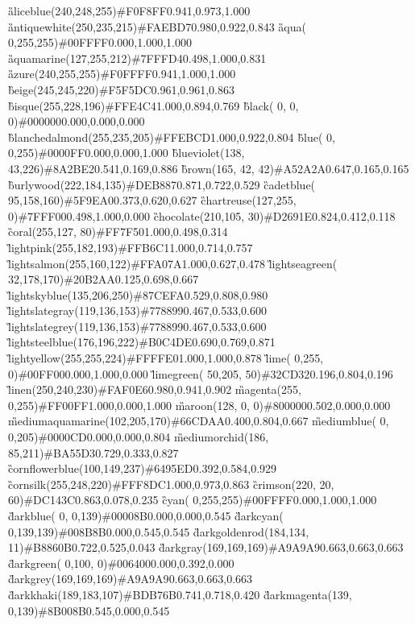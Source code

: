 \G{aliceblue}{(240,248,255)}{\#F0F8FF}{0.941,0.973,1.000}
\G{antiquewhite}{(250,235,215)}{\#FAEBD7}{0.980,0.922,0.843}
\G{aqua}{(  0,255,255)}{\#00FFFF}{0.000,1.000,1.000}
\G{aquamarine}{(127,255,212)}{\#7FFFD4}{0.498,1.000,0.831}
\G{azure}{(240,255,255)}{\#F0FFFF}{0.941,1.000,1.000}
\G{beige}{(245,245,220)}{\#F5F5DC}{0.961,0.961,0.863}
\G{bisque}{(255,228,196)}{\#FFE4C4}{1.000,0.894,0.769}
\G{black}{(  0,  0,  0)}{\#000000}{0.000,0.000,0.000}
\G{blanchedalmond}{(255,235,205)}{\#FFEBCD}{1.000,0.922,0.804}
\G{blue}{(  0,  0,255)}{\#0000FF}{0.000,0.000,1.000}
\G{blueviolet}{(138, 43,226)}{\#8A2BE2}{0.541,0.169,0.886}
\G{brown}{(165, 42, 42)}{\#A52A2A}{0.647,0.165,0.165}
\G{burlywood}{(222,184,135)}{\#DEB887}{0.871,0.722,0.529}
\G{cadetblue}{( 95,158,160)}{\#5F9EA0}{0.373,0.620,0.627}
\G{chartreuse}{(127,255,  0)}{\#7FFF00}{0.498,1.000,0.000}
\G{chocolate}{(210,105, 30)}{\#D2691E}{0.824,0.412,0.118}
\G{coral}{(255,127, 80)}{\#FF7F50}{1.000,0.498,0.314}
\G{lightpink}{(255,182,193)}{\#FFB6C1}{1.000,0.714,0.757}
\G{lightsalmon}{(255,160,122)}{\#FFA07A}{1.000,0.627,0.478}
\G{lightseagreen}{( 32,178,170)}{\#20B2AA}{0.125,0.698,0.667}
\G{lightskyblue}{(135,206,250)}{\#87CEFA}{0.529,0.808,0.980}
\G{lightslategray}{(119,136,153)}{\#778899}{0.467,0.533,0.600}
\G{lightslategrey}{(119,136,153)}{\#778899}{0.467,0.533,0.600}
\G{lightsteelblue}{(176,196,222)}{\#B0C4DE}{0.690,0.769,0.871}
\G{lightyellow}{(255,255,224)}{\#FFFFE0}{1.000,1.000,0.878}
\G{lime}{(  0,255,  0)}{\#00FF00}{0.000,1.000,0.000}
\G{limegreen}{( 50,205, 50)}{\#32CD32}{0.196,0.804,0.196}
\G{linen}{(250,240,230)}{\#FAF0E6}{0.980,0.941,0.902}
\G{magenta}{(255,  0,255)}{\#FF00FF}{1.000,0.000,1.000}
\G{maroon}{(128,  0,  0)}{\#800000}{0.502,0.000,0.000}
\G{mediumaquamarine}{(102,205,170)}{\#66CDAA}{0.400,0.804,0.667}
\G{mediumblue}{(  0,  0,205)}{\#0000CD}{0.000,0.000,0.804}
\G{mediumorchid}{(186, 85,211)}{\#BA55D3}{0.729,0.333,0.827}
\G{cornflowerblue}{(100,149,237)}{\#6495ED}{0.392,0.584,0.929}
\G{cornsilk}{(255,248,220)}{\#FFF8DC}{1.000,0.973,0.863}
\G{crimson}{(220, 20, 60)}{\#DC143C}{0.863,0.078,0.235}
\G{cyan}{(  0,255,255)}{\#00FFFF}{0.000,1.000,1.000}
\G{darkblue}{(  0,  0,139)}{\#00008B}{0.000,0.000,0.545}
\G{darkcyan}{(  0,139,139)}{\#008B8B}{0.000,0.545,0.545}
\G{darkgoldenrod}{(184,134, 11)}{\#B8860B}{0.722,0.525,0.043}
\G{darkgray}{(169,169,169)}{\#A9A9A9}{0.663,0.663,0.663}
\G{darkgreen}{(  0,100,  0)}{\#006400}{0.000,0.392,0.000}
\G{darkgrey}{(169,169,169)}{\#A9A9A9}{0.663,0.663,0.663}
\G{darkkhaki}{(189,183,107)}{\#BDB76B}{0.741,0.718,0.420}
\G{darkmagenta}{(139,  0,139)}{\#8B008B}{0.545,0.000,0.545}
